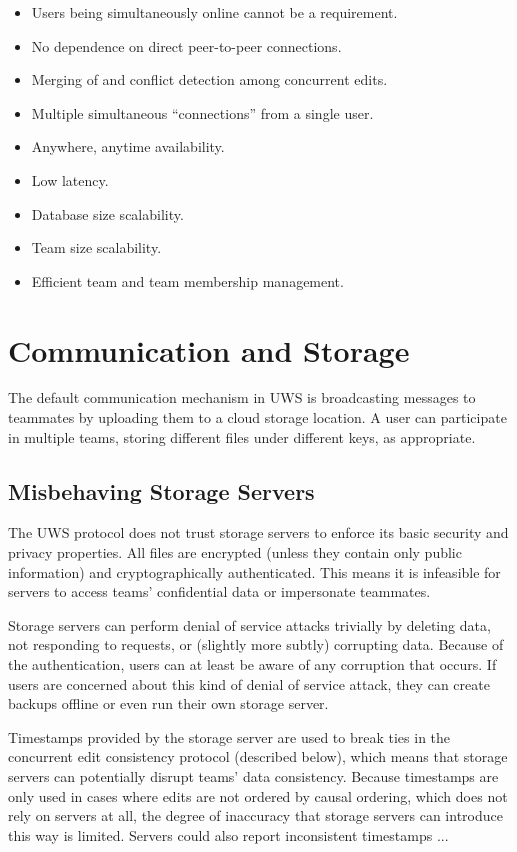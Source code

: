 \documentclass{article}
\begin{document}
\begin{itemize}
\item Users being simultaneously online cannot be a requirement.
\item No dependence on direct peer-to-peer connections.
\item Merging of and conflict detection among concurrent edits.
\item Multiple simultaneous ``connections'' from a single user.
\item Anywhere, anytime availability.
\item Low latency.
\item Database size scalability.
\item Team size scalability.
\item Efficient team and team membership management.
\end{itemize}

\section{Communication and Storage}


The default communication mechanism in UWS is broadcasting messages to teammates by uploading them to a cloud storage location.
A user can participate in multiple teams, storing different files under different keys, as appropriate.

\subsection{Misbehaving Storage Servers}

The UWS protocol does not trust storage servers to enforce its basic security and privacy properties.
All files are encrypted (unless they contain only public information) and cryptographically authenticated.
This means it is infeasible for servers to access teams' confidential data or impersonate teammates.

Storage servers can perform denial of service attacks trivially by deleting data, not responding to requests, or (slightly more subtly) corrupting data.
Because of the authentication, users can at least be aware of any corruption that occurs.
If users are concerned about this kind of denial of service attack, they can create backups offline or even run their own storage server.

Timestamps provided by the storage server are used to break ties in the concurrent edit consistency protocol (described below), which means that storage servers can potentially disrupt teams' data consistency.
Because timestamps are only used in cases where edits are not ordered by causal ordering, which does not rely on servers at all, the degree of inaccuracy that storage servers can introduce this way is limited.
Servers could also report inconsistent timestamps ...
\end{document}
